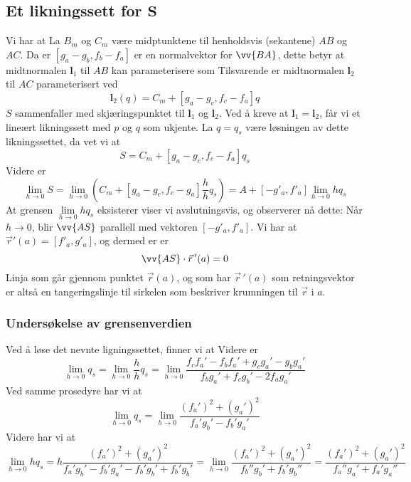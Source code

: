 \subsection*{Et likningssett for $\bm S $}
Vi har at
La $ B_m $ og $ C_m $ være midptunktene til henholdsvis  (sekantene) $ AB $ og $ AC $. Da er
$ [g_a-g_b,f_b-f_a] $ er en normalvektor for $ \vv{BA} $, dette betyr at midtnormalen $\bm l_1 $ til $ AB $ kan parameterisere som
Tilsvarende er midtnormalen $\bm l_2 $ til $ AC $ parameterisert ved
\[ {\bm l_2(q)}=C_m+[g_a-g_c,f_c-f_a] q \]
$ S $ sammenfaller med skjæringspunktet til $\bm l_1 $ og $\bm l_2 $.
Ved å kreve at $\bm l_1= \bm l_2 $, får vi et lineært likningssett med $ p $ og $ q $ som ukjente. La $ q=q_s $ være løsningen av dette likningssettet, da vet vi at
\[ S=C_m+[g_a-g_c, f_c-f_a]q_s\]
Videre er
\[ \lim\limits_{h\to0}S=\lim\limits_{h\to0}\left(C_m+[g_a-g_c, f_c-g_a]\frac{h}{h}q_s\right)=A+[-g'_a, f'_a]\lim\limits_{h\to 0}h q_s \]
At grensen $ \lim\limits_{h\to 0}h q_s $ eksisterer viser vi avslutningsvis, og observerer nå dette: Når $ h\to0 $, blir $ \vv{AS} $ parallell med vektoren $ [-g'_a, f'_a] $. Vi har at $ \vec{r}'(a)=[f'_a, g'_a] $, og dermed er er 
\[ \vv{AS}\cdot \vec{r}\,'(a)=0 \]
Linja som går gjennom punktet $ \vec{r}(a) $, og som har $ \vec{r}\,'(a) $ som retningsvektor er altså en tangeringslinje til sirkelen som beskriver krumningen til $ \vec{r} $ i $ a $. \vsk

\subsubsection{Undersøkelse av grensenverdien}
Ved å løse det nevnte ligningssettet, finner vi at
Videre er
\[ \lim\limits_{h\to 0} q_s=\lim\limits_{h\to 0}\frac{h}{h}q_s=\lim\limits_{h\to 0}\frac{f_cf_a'-f_bf_a'+g_cg_a'-g_bg_a'}{f_bg_a'+f_cg_b'-2f_ag_a'} \]
Ved samme prosedyre har vi at
\[\lim\limits_{h\to 0}q_s= \lim\limits_{h\to 0} \frac{(f_a')^2+(g_a')^2}{f_a'g_b'-f_b'g_a'} \]
Videre har vi at {\footnotesize
\[ \lim\limits_{h\to 0}h q_s= h\frac{(f_a')^2+(g_a')^2}{f_a'g_b'-f_b'g_a'-f_b'g_b'+f_b'g_b'}=\lim\limits_{h\to 0}\frac{(f_a')^2+(g_a')^2}{f_b''g_b'+f_b'g_b''}=\frac{(f_a')^2+(g_a')^2}{f_a''g_a'+f_a'g_a''} \]}
